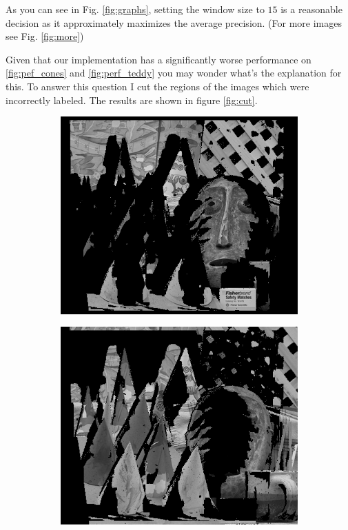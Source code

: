 \documentclass[letterpaper,12pt]{article}
\begin{document}
As you can see in Fig. \ref{fig:graphs}, setting the window size to $15$ is a reasonable decision as it approximately maximizes the average precision. (For more images see Fig. \ref{fig:more})

Given that our implementation has a significantly worse performance on \ref{fig:pef_cones} and \ref{fig:perf_teddy} you may wonder what's the explanation for this. To answer this question I cut the regions of the images which were incorrectly labeled. The results are shown in figure \ref{fig:cut}.

\begin{figure}[!h]
        \centering
        \begin{subfigure}[b]{0.30\textwidth}
                \includegraphics[width=\textwidth]{correct-conesO.png}

        \end{subfigure}%
        \quad
        \begin{subfigure}[b]{0.30\textwidth}
                \includegraphics[width=\textwidth]{icorrect-conesO.png}


\end{subfigure}
\end{figure}
\end{document}
